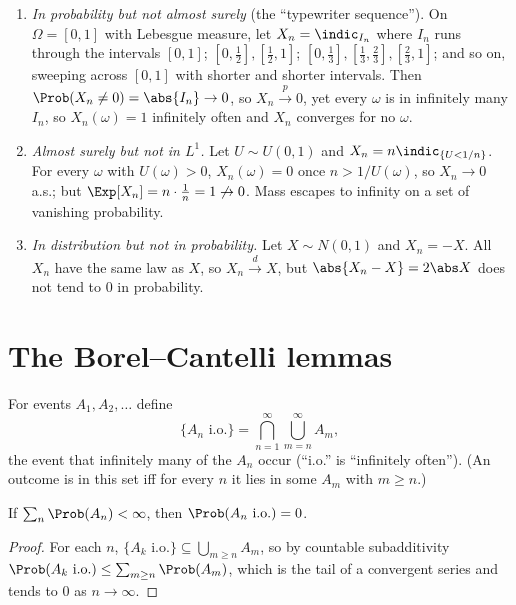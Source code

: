 \begin{example}\label{ex:conversefail}
\begin{enumerate}[label=(\roman*)]
\item \emph{In probability but not almost surely} (the ``typewriter sequence''). On
$\Omega=[0,1]$ with Lebesgue measure, let $X_n=\indic_{I_n}$ where $I_n$ runs through
the intervals $[0,1]$; $[0,\frac12],[\frac12,1]$; $[0,\frac13],[\frac13,\frac23],[\frac23,1]$;
and so on, sweeping across $[0,1]$ with shorter and shorter intervals. Then
$\Prob(X_n\ne0)=\abs{I_n}\to0$, so $X_n\xrightarrow{p}0$, yet every $\omega$ is in
infinitely many $I_n$, so $X_n(\omega)=1$ infinitely often and $X_n$ converges for no
$\omega$.
\item \emph{Almost surely but not in $L^1$.} Let $U\sim U(0,1)$ and
$X_n=n\indic_{\{U<1/n\}}$. For every $\omega$ with $U(\omega)>0$, $X_n(\omega)=0$ once
$n>1/U(\omega)$, so $X_n\to0$ a.s.; but $\Exp[X_n]=n\cdot\frac1n=1\not\to0$. Mass
escapes to infinity on a set of vanishing probability.
\item \emph{In distribution but not in probability.} Let $X\sim N(0,1)$ and
$X_n=-X$. All $X_n$ have the same law as $X$, so $X_n\xrightarrow{d}X$, but
$\abs{X_n-X}=2\abs X$ does not tend to $0$ in probability.
\end{enumerate}
\end{example}

\section{The Borel--Cantelli lemmas}

For events $A_1,A_2,\dots$ define
\[
\{A_n\text{ i.o.}\}=\bigcap_{n=1}^\infty\bigcup_{m=n}^\infty A_m,
\]
the event that infinitely many of the $A_n$ occur (``i.o.'' is ``infinitely often'').
(An outcome is in this set iff for every $n$ it lies in some $A_m$ with $m\ge n$.)

\begin{theorem}\label{thm:bc1}
If $\sum_n\Prob(A_n)<\infty$, then $\Prob(A_n\text{ i.o.})=0$.
\end{theorem}
\begin{proof}
For each $n$, $\{A_k\text{ i.o.}\}\subseteq\bigcup_{m\ge n}A_m$, so by countable
subadditivity $\Prob(A_k\text{ i.o.})\le\sum_{m\ge n}\Prob(A_m)$, which is the tail of
a convergent series and tends to $0$ as $n\to\infty$.
\end{proof}

